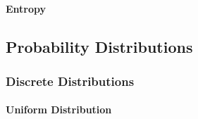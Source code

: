 


%

\paragraph{Entropy}









\subsection{Probability Distributions}


\subsubsection{Discrete Distributions}

\paragraph{Uniform Distribution}

